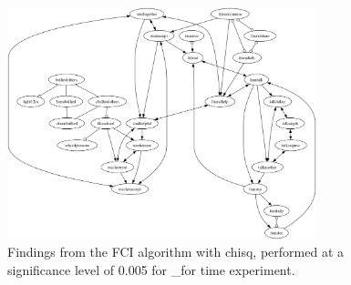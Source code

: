 \begin{figure}[htbp]
    \centering
    \includegraphics[width=0.8\textwidth]{Report/final_report/pictures/FCI_chisq_0.005__for time experiment.png}
    \caption{Findings from the FCI algorithm with chisq, performed at a significance level of 0.005 for _for time experiment.}
    \label{fig:fci_chisq_0.005_for time experiment}
\end{figure}
